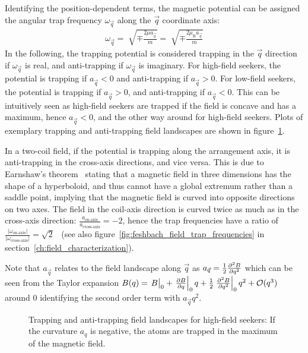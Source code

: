 Identifying the position-dependent terms, the magnetic potential can be assigned the angular trap frequency $\omega_{\vec q}$ along the $\vec q$ coordinate axis:
\begin{align}\label{eq:trap_omega_definition}
    \omega_{\vec q} = \sqrt[]{\mp\frac{2 \mu a_{\vec q}}{m}} = \sqrt[]{\mp\frac{2 \mu_\text{B} a_{\vec q}}{m}}
\end{align}
In the following, the trapping potential is considered trapping in the ${\vec q}$ direction if $\omega_{\vec q}$ is real, and anti-trapping if $\omega_{\vec q}$ is imaginary. For high-field seekers, the potential is trapping if $a_{\vec q} < 0$ and anti-trapping if $a_{\vec q} > 0$. For low-field seekers, the potential is trapping if $a_{\vec q} > 0$, and anti-trapping if $a_{\vec q} < 0$. This can be intuitively seen as high-field seekers are trapped if the field is concave and has a maximum, hence $a_{\vec q} < 0$, and the other way around for high-field seekers. Plots of exemplary trapping and anti-trapping field landscapes are shown in figure~\ref{fig:magnetic_field_curvature_examples}.

In a two-coil field, if the potential is trapping along the arrangement axis, it is anti-trapping in the cross-axis directions, and vice versa. This is due to Earnshaw's theorem~\cite{earnshaw_nature_1842} stating that a magnetic field in three dimensions has the shape of a hyperboloid, and thus cannot have a global extremum rather than a saddle point, implying that the magnetic field is curved into opposite directions on two axes. The field in the coil-axis direction is curved twice as much as in the cross-axis direction: $\frac{a_\text{on-axis}}{a_\text{cross-axis}} = -2$, hence the trap frequencies have a ratio of $\frac{|\omega_\text{on-axis}|}{|\omega_\text{cross-axis}|} = \sqrt{2}$~\cite{hagemann_setup_2020} (see also figure~\ref{fig:feshbach_field_trap_frequencies} in section~\ref{ch:field_characterization}).

Note that $a_{\vec q}$ relates to the field landscape along ${\vec q}$ as $a_{\vec q}  = \frac{1}{2} \pdv[2]{B}{q}$ which can be seen from the Taylor expansion $B(q) = \eval{B}_{0} + \eval{\pdv{B}{q}}_{0} q + \frac{1}{2} \eval{\pdv[2]{B}{q}}_{0} q^2 + \mathcal{O}(q^3)$ around $0$ identifying the second order term with $a_{\vec q} q^2$.

\begin{figure}
    \caption{Trapping and anti-trapping field landscapes for high-field seekers: If the curvature $a_q$ is negative, the atoms are trapped in the maximum of the magnetic field.}
    \label{fig:magnetic_field_curvature_examples}
\end{figure}

